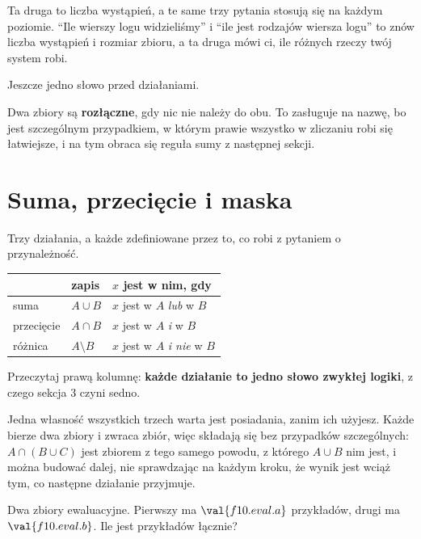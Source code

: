 \begin{fr}
Ta druga to liczba wystąpień, a te same trzy pytania stosują się na każdym
poziomie.
\enquote{Ile wierszy logu widzieliśmy} i \enquote{ile jest rodzajów wiersza
logu} to znów liczba wystąpień i rozmiar zbioru, a ta druga mówi ci, ile
różnych rzeczy twój system robi.
\end{fr}

\begin{fr}
Jeszcze jedno słowo przed działaniami.

Dwa zbiory są \textbf{rozłączne}, gdy nic nie należy do obu. To zasługuje na
nazwę, bo jest szczególnym przypadkiem, w którym prawie wszystko w zliczaniu
robi się łatwiejsze, i na tym obraca się reguła sumy z następnej sekcji.
\end{fr}

\section{Suma, przecięcie i maska}
\label{sec:F10-operations}

\begin{fr}
Trzy działania, a każde zdefiniowane przez to, co robi z pytaniem o
przynależność.

\begin{center}
\begin{tabular}{lll}
\toprule
& zapis & $x$ jest w nim, gdy \\
\midrule
suma & $A \cup B$ & $x$ jest w $A$ \emph{lub} w $B$ \\
przecięcie & $A \cap B$ & $x$ jest w $A$ \emph{i} w $B$ \\
różnica & $A \setminus B$ & $x$ jest w $A$ \emph{i nie} w $B$ \\
\bottomrule
\end{tabular}
\end{center}

Przeczytaj prawą kolumnę: \textbf{każde działanie to jedno słowo zwykłej
logiki}, z czego sekcja 3 czyni sedno.

Jedna własność wszystkich trzech warta jest posiadania, zanim ich użyjesz.
Każde bierze dwa zbiory i zwraca zbiór, więc składają się bez przypadków
szczególnych: $A \cap (B \cup C)$ jest zbiorem z tego samego powodu, z którego
$A \cup B$ nim jest, i można budować dalej, nie sprawdzając na każdym kroku,
że wynik jest wciąż tym, co następne działanie przyjmuje.

Dwa zbiory ewaluacyjne. Pierwszy ma $\val{f10.eval.a}$ przykładów, drugi ma
$\val{f10.eval.b}$. Ile jest przykładów łącznie?
\dotline
\nextframe
\end{fr}

